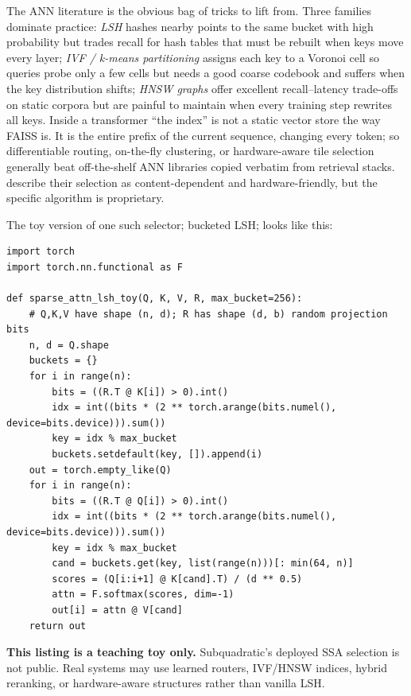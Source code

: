 The ANN literature is the obvious bag of tricks to lift from. Three
families dominate practice: \emph{LSH} hashes nearby points to the same
bucket with high probability but trades recall for hash tables that must
be rebuilt when keys move every layer; \emph{IVF / k-means partitioning}
assigns each key to a Voronoi cell so queries probe only a few cells but
needs a good coarse codebook and suffers when the key distribution
shifts; \emph{HNSW graphs} offer excellent recall–latency trade-offs on
static corpora but are painful to maintain when every training step
rewrites all keys. Inside a transformer ``the index'' is not a static
vector store the way FAISS is. It is the entire prefix of the current
sequence, changing every token; so differentiable routing, on-the-fly
clustering, or hardware-aware tile selection generally beat off-the-shelf
ANN libraries copied verbatim from retrieval stacks. \citet{subq2026ssa}
describe their selection as content-dependent and hardware-friendly, but
the specific algorithm is proprietary.

The toy version of one such selector; bucketed LSH; looks like this:

\begin{lstlisting}[caption={\textbf{Illustrative only}---LSH bucketing is one toy selector; SubQ's production SSA router is proprietary and not LSH-specific.}]
import torch
import torch.nn.functional as F

def sparse_attn_lsh_toy(Q, K, V, R, max_bucket=256):
    # Q,K,V have shape (n, d); R has shape (d, b) random projection bits
    n, d = Q.shape
    buckets = {}
    for i in range(n):
        bits = ((R.T @ K[i]) > 0).int()
        idx = int((bits * (2 ** torch.arange(bits.numel(), device=bits.device))).sum())
        key = idx % max_bucket
        buckets.setdefault(key, []).append(i)
    out = torch.empty_like(Q)
    for i in range(n):
        bits = ((R.T @ Q[i]) > 0).int()
        idx = int((bits * (2 ** torch.arange(bits.numel(), device=bits.device))).sum())
        key = idx % max_bucket
        cand = buckets.get(key, list(range(n)))[: min(64, n)]
        scores = (Q[i:i+1] @ K[cand].T) / (d ** 0.5)
        attn = F.softmax(scores, dim=-1)
        out[i] = attn @ V[cand]
    return out
\end{lstlisting}

\noindent
\textbf{This listing is a teaching toy only.} Subquadratic's deployed
SSA selection is not public. Real systems may use learned routers,
IVF/HNSW indices, hybrid reranking, or hardware-aware structures rather
than vanilla LSH.

